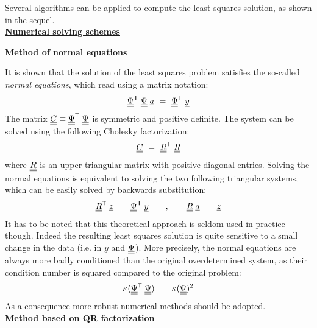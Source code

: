 {  Several algorithms can be applied to compute the least squares solution, as shown in the sequel. \\

  \underline{\textbf{Numerical solving schemes}} \vspace{3mm}

  \textbf{Method of normal equations} \vspace{2mm}

  It is shown that the solution of the least squares problem satisfies the so-called \emph{normal equations}, which read using a matrix notation:
  \begin{align*}
    \underline{\underline{\Psi}}^{\mbox{\scriptsize \textsf{T}}} \; \underline{\underline{\Psi}} \; \underline{a} \, \, = \, \, \underline{\underline{\Psi}}^{\mbox{\scriptsize \textsf{T}}} \; \underline{y}
  \end{align*}
  The matrix $\underline{\underline{C}} \equiv \underline{\underline{\Psi}}^{\mbox{\scriptsize \textsf{T}}} \; \underline{\underline{\Psi}}$ is symmetric and positive definite. The system can be solved using the following Cholesky factorization:
  \begin{align*}
    \underline{\underline{C}} \, \, = \, \, \underline{\underline{R}}^{\mbox{\scriptsize \textsf{T}}} \; \underline{\underline{R}}
  \end{align*}
  where $\underline{\underline{R}}$ is an upper triangular matrix with positive diagonal entries. Solving the normal equations is equivalent to solving the two following triangular systems, which can be easily solved by backwards substitution:
  \begin{align*}
    \underline{\underline{R}}^{\mbox{\scriptsize \textsf{T}}} \; \underline{z} \, \, = \, \, \underline{\underline{\Psi}}^{\mbox{\scriptsize \textsf{T}}} \; \underline{y}
    \qquad , \qquad \underline{\underline{R}} \; \underline{a} \, \, = \, \, \underline{z}
  \end{align*}
  It has to be noted that this theoretical approach is seldom used in practice though. Indeed the resulting least squares solution is quite sensitive to a small change in the data (i.e. in $\underline{y}$ and $\underline{\underline{\Psi}}$). More precisely, the normal equations are always more badly conditioned than the original overdetermined system, as their condition number is squared compared to the original problem:
  \begin{align*}
    \kappa(\underline{\underline{\Psi}}^{\mbox{\scriptsize \textsf{T}}} \; \underline{\underline{\Psi}}) \, \, = \, \, \kappa(\underline{\underline{\Psi}})^2
  \end{align*}
  As a consequence more robust numerical methods should be adopted. \\

  \textbf{Method based on QR factorization} \vspace{2mm}

}
